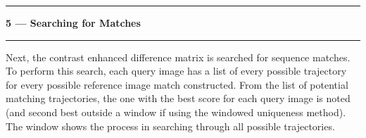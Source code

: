 \noindent\rule{\textwidth}{1pt}
\indent \textbf{5 --- Searching for Matches}
\noindent\rule{\textwidth}{1pt}
\smallskip
\parbox{\textwidth}{Next, the contrast enhanced difference matrix is searched for sequence matches. To perform this search, each query image has a list of every possible trajectory for every possible reference image match constructed. From the list of potential matching trajectories, the one with the best score for each query image is noted (and second best outside a window if using the windowed uniqueness method). The window shows the process in searching through all possible trajectories.}
\smallskip
